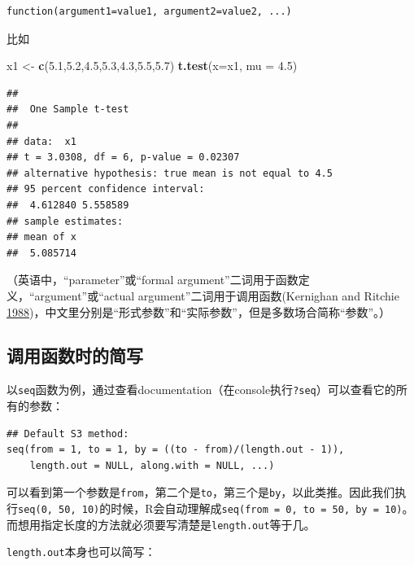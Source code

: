 \documentclass[]{book}
\newenvironment{Shaded}{\begin{snugshade}}{\end{snugshade}}
\newcommand{\DataTypeTok}[1]{\textcolor[rgb]{0.13,0.29,0.53}{#1}}
\newcommand{\FloatTok}[1]{\textcolor[rgb]{0.00,0.00,0.81}{#1}}
\newcommand{\KeywordTok}[1]{\textcolor[rgb]{0.13,0.29,0.53}{\textbf{#1}}}
\newcommand{\NormalTok}[1]{#1}
\newcommand{\StringTok}[1]{\textcolor[rgb]{0.31,0.60,0.02}{#1}}
\begin{document}
\begin{verbatim}
function(argument1=value1, argument2=value2, ...)
\end{verbatim}

比如

\begin{Shaded}
\begin{Highlighting}[]
\NormalTok{x1 <-}\StringTok{ }\KeywordTok{c}\NormalTok{(}\FloatTok{5.1}\NormalTok{,}\FloatTok{5.2}\NormalTok{,}\FloatTok{4.5}\NormalTok{,}\FloatTok{5.3}\NormalTok{,}\FloatTok{4.3}\NormalTok{,}\FloatTok{5.5}\NormalTok{,}\FloatTok{5.7}\NormalTok{)}
\KeywordTok{t.test}\NormalTok{(}\DataTypeTok{x=}\NormalTok{x1, }\DataTypeTok{mu =} \FloatTok{4.5}\NormalTok{)}
\end{Highlighting}
\end{Shaded}

\begin{verbatim}
## 
##  One Sample t-test
## 
## data:  x1
## t = 3.0308, df = 6, p-value = 0.02307
## alternative hypothesis: true mean is not equal to 4.5
## 95 percent confidence interval:
##  4.612840 5.558589
## sample estimates:
## mean of x 
##  5.085714
\end{verbatim}

（英语中，``parameter''或``formal argument''二词用于函数定义，``argument''或``actual argument''二词用于调用函数(Kernighan and Ritchie \protect\hyperlink{ref-Kernighan1988The-C-Programming-La}{1988})，中文里分别是``形式参数''和``实际参数''，但是多数场合简称``参数''。）

\hypertarget{abbr}{%
\subsection{调用函数时的简写}\label{abbr}}

以\texttt{seq}函数为例，通过查看documentation（在console执行\texttt{?seq}）可以查看它的所有的参数：

\begin{verbatim}
## Default S3 method:
seq(from = 1, to = 1, by = ((to - from)/(length.out - 1)),
    length.out = NULL, along.with = NULL, ...)
\end{verbatim}

可以看到第一个参数是\texttt{from}，第二个是\texttt{to}，第三个是\texttt{by}，以此类推。因此我们执行\texttt{seq(0,\ 50,\ 10)}的时候，R会自动理解成\texttt{seq(from\ =\ 0,\ to\ =\ 50,\ by\ =\ 10)}。而想用指定长度的方法就必须要写清楚是\texttt{length.out}等于几。

\texttt{length.out}本身也可以简写：
\end{document}

